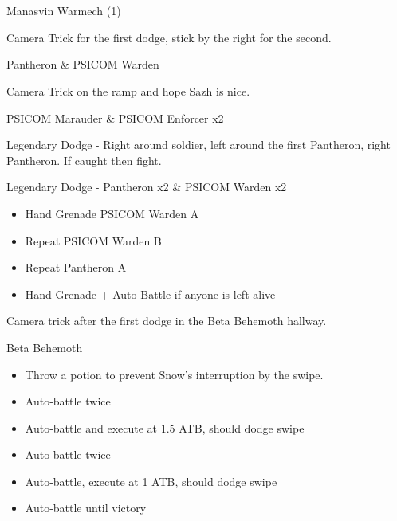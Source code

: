 \chapter[Chapter 1]{}
\begin{multicols}{2}
\begin{battle}{Manasvin Warmech (1)}
\end{battle}

Camera Trick for the first dodge, stick by the right for the second.

\begin{battle}{Pantheron \& PSICOM Warden}
\end{battle}

Camera Trick on the ramp and hope Sazh is nice.

\begin{battle}{PSICOM Marauder \& PSICOM Enforcer x2}
\end{battle}

Legendary Dodge - Right around soldier, left around the first Pantheron, right Pantheron. If caught then fight.

\begin{battle}{Legendary Dodge - Pantheron x2 \& PSICOM Warden x2}
\begin{itemize}
    \item Hand Grenade PSICOM Warden A
    \item Repeat PSICOM Warden B
    \item Repeat Pantheron A
    \item Hand Grenade + Auto Battle if anyone is left alive
\end{itemize}

\end{battle}

Camera trick after the first dodge in the Beta Behemoth hallway.

\begin{battle}{Beta Behemoth}
\begin{itemize}
    \item Throw a potion to prevent Snow's interruption by the swipe.
    \item Auto-battle twice
    \item Auto-battle and execute at 1.5 ATB, should dodge swipe
    \item Auto-battle twice
    \item Auto-battle, execute at 1 ATB, should dodge swipe
    \item Auto-battle until victory
\end{itemize}
\end{battle}


\end{multicols}
